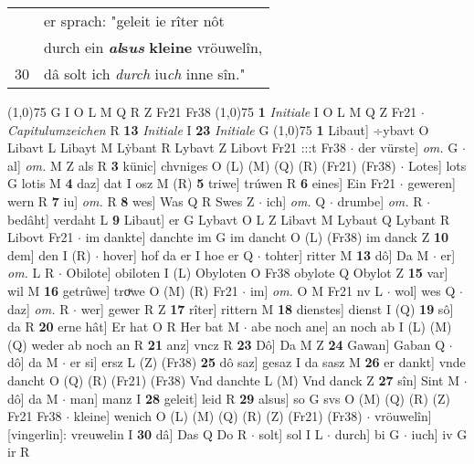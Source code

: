 \documentclass[8pt,a4paper,notitlepage]{article}
\begin{document}
\begin{table}[ht]
\begin{minipage}[t]{0.5\linewidth}
\begin{tabular}{rl}
 & er sprach: "geleit ie rîter nôt\\ 
 & durch ein \textbf{\textit{al}s\textit{us}} \textbf{kleine} vröuwelîn,\\ 
30 & dâ solt ich \textit{durch} iu\textit{ch} inne sîn."\\ 
\end{tabular}
\scriptsize
\line(1,0){75} \newline
G I O L M Q R Z Fr21 Fr38 \newline
\line(1,0){75} \newline
\textbf{1} \textit{Initiale} I O L M Q Z Fr21   $\cdot$ \textit{Capitulumzeichen} R  \textbf{13} \textit{Initiale} I  \textbf{23} \textit{Initiale} G  \newline
\line(1,0){75} \newline
\textbf{1} Libaut] ÷ybavt O Libavt L Libayt M Lẏbant R Lybavt Z Libovt Fr21 :::t Fr38  $\cdot$ der vürste] \textit{om.} G  $\cdot$ al] \textit{om.} M Z als R \textbf{3} künic] chvniges O (L) (M) (Q) (R) (Fr21) (Fr38)  $\cdot$ Lotes] lots G lotis M \textbf{4} daz] dat I osz M (R) \textbf{5} triwe] trúwen R \textbf{6} eines] Ein Fr21  $\cdot$ geweren] wern R \textbf{7} iu] \textit{om.} R \textbf{8} wes] Was Q R Swes Z  $\cdot$ ich] \textit{om.} Q  $\cdot$ drumbe] \textit{om.} R  $\cdot$ bedâht] verdaht L \textbf{9} Libaut] er G Lybavt O L Z Libavt M Lybaut Q Lybant R Libovt Fr21  $\cdot$ im dankte] danchte im G im dancht O (L) (Fr38) im danck Z \textbf{10} dem] den I (R)  $\cdot$ hover] hof da er I hoe er Q  $\cdot$ tohter] ritter M \textbf{13} dô] Da M  $\cdot$ er] \textit{om.} L R  $\cdot$ Obilote] obiloten I (L) Obyloten O Fr38 obylote Q Obylot Z \textbf{15} var] wil M \textbf{16} getrûwe] troͮwe O (M) (R) Fr21  $\cdot$ im] \textit{om.} O M Fr21 nv L  $\cdot$ wol] wes Q  $\cdot$ daz] \textit{om.} R  $\cdot$ wer] gewer R Z \textbf{17} rîter] rittern M \textbf{18} dienstes] dienst I (Q) \textbf{19} sô] da R \textbf{20} erne hât] Er hat O R Her bat M  $\cdot$ abe noch ane] an noch ab I (L) (M) (Q) weder ab noch an R \textbf{21} anz] vncz R \textbf{23} Dô] Da M Z \textbf{24} Gawan] Gaban Q  $\cdot$ dô] da M  $\cdot$ er si] ersz L (Z) (Fr38) \textbf{25} dô saz] gesaz I da sasz M \textbf{26} er dankt] vnde dancht O (Q) (R) (Fr21) (Fr38) Vnd danchte L (M) Vnd danck Z \textbf{27} sîn] Sint M  $\cdot$ dô] da M  $\cdot$ man] manz I \textbf{28} geleit] leid R \textbf{29} alsus] so G svs O (M) (Q) (R) (Z) Fr21 Fr38  $\cdot$ kleine] wenich O (L) (M) (Q) (R) (Z) (Fr21) (Fr38)  $\cdot$ vröuwelîn] [vingerlin]: vreuwelin I \textbf{30} dâ] Das Q Do R  $\cdot$ solt] sol I L  $\cdot$ durch] bi G  $\cdot$ iuch] iv G ir R \newline

\end{minipage}
\end{table}
\end{document}
